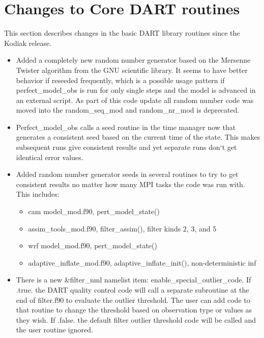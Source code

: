 \documentclass[letterpaper,10pt,english]{sphinxmanual}
\begin{document}
\section{Changes to Core DART routines}
\label{docs/Lanai_diffs_from_Kodiak:changes-to-core-dart-routines}
This section describes changes in the basic DART library routines since
the Kodiak release.
\begin{itemize}
\item {} 
Added a completely new random number generator based on the Mersenne
Twister algorithm from the GNU scientific library. It seems to have
better behavior if reseeded frequently, which is a possible usage
pattern if perfect\_model\_obs is run for only single steps and the
model is advanced in an external script. As part of this code update
all random number code was moved into the random\_seq\_mod and
random\_nr\_mod is deprecated.

\item {} 
Perfect\_model\_obs calls a seed routine in the time manager now
that generates a consistent seed based on the current time of the
state. This makes subsequent runs give consistent results and yet
separate runs don`t get identical error values.

\item {} 
Added random number generator seeds in several routines to try to
get consistent results no matter how many MPI tasks the code was run
with. This includes:
\begin{itemize}
\item {} 
cam model\_mod.f90, pert\_model\_state()

\item {} 
assim\_tools\_mod.f90, filter\_assim(), filter kinds 2, 3, and 5

\item {} 
wrf model\_mod.f90, pert\_model\_state()

\item {} 
adaptive\_inflate\_mod.f90, adaptive\_inflate\_init(),
non-deterministic inf

\end{itemize}

\item {} 
There is a new \&filter\_nml namelist item:
enable\_special\_outlier\_code. If .true. the DART quality control
code will call a separate subroutine at the end of filter.f90 to
evaluate the outlier threshold. The user can add code to that
routine to change the threshold based on observation type or values
as they wish. If .false. the default filter outlier threshold code
will be called and the user routine ignored.


\end{itemize}
\end{document}
